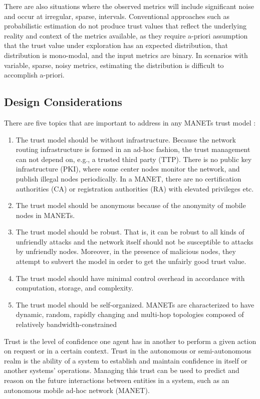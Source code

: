 There are also situations where the observed metrics will include significant noise and occur at irregular, sparse, intervals.
Conventional approaches such as probabilistic estimation do not produce trust values that reflect the underlying reality and context of the metrics available, as they require a-priori assumption that the trust value under exploration has an expected distribution, that distribution is mono-modal, and the input metrics are binary.
In scenarios with variable, sparse, noisy metrics, estimating the distribution is difficult to accomplish a-priori.


\subsection{Design Considerations}

There are five topics that are important to address in any MANETs trust model \cite{Kamvar2003}:

\begin{enumerate}
  \item The trust model should be without infrastructure. Because the network routing infrastructure is formed in an ad-hoc fashion, the trust management can not depend on, e.g., a trusted third party (TTP). There is no public key infrastructure (PKI), where some center nodes monitor the network, and publish illegal nodes periodically. In a MANET, there are no certification authorities (CA) or registration authorities (RA) with elevated privileges etc.
  \item The trust model should be anonymous because of the anonymity of mobile nodes in MANETs.
  \item The trust model should be robust. That is, it can be robust to all kinds of unfriendly attacks and the network itself should not be susceptible to attacks by unfriendly nodes. Moreover, in the presence of malicious nodes, they attempt to subvert the model in order to get the unfairly good trust value.
  \item The trust model should have minimal control overhead in accordance with computation, storage, and complexity.
  \item The trust model should be self-organized. MANETs are characterized to have dynamic, random, rapidly changing and multi-hop topologies composed of relatively bandwidth-constrained
\end{enumerate}

Trust is the level of confidence one agent has in another to perform a given action on request or in a certain context. Trust in the autonomous or semi-autonomous realm is the ability of a system to establish and maintain confidence in itself or another systems' operations. 
Managing this trust can be used to predict and reason on the future interactions between entities in a system, such as an autonomous mobile ad-hoc network (MANET).

